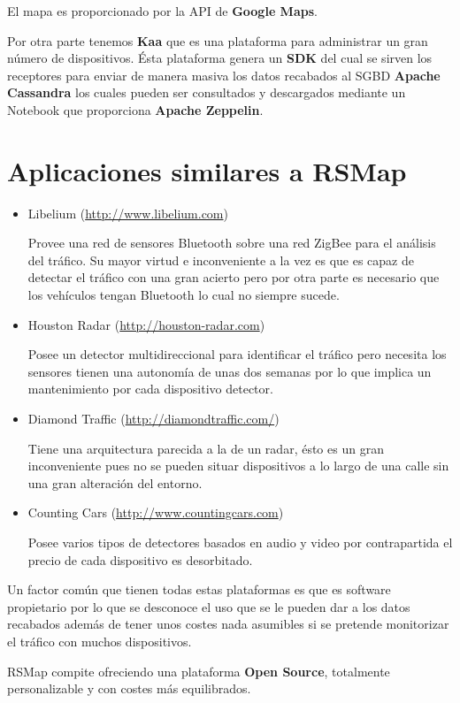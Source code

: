 El mapa es proporcionado por la API de \textbf{Google Maps}.

Por otra parte tenemos \textbf{Kaa} que es una plataforma para administrar un gran número de dispositivos. Ésta plataforma genera un \textbf{SDK} del cual se sirven los receptores para enviar de manera masiva los datos recabados al SGBD \textbf{Apache Cassandra} los cuales pueden ser consultados y descargados mediante un Notebook que proporciona \textbf{Apache Zeppelin}.

\section{Aplicaciones similares a RSMap}
\begin{itemize}
  \item Libelium (\url{http://www.libelium.com})

    Provee una red de sensores Bluetooth sobre una red ZigBee para el análisis del tráfico. Su mayor virtud e inconveniente a la vez es que es capaz de detectar el tráfico con una gran acierto pero por otra parte es necesario que los vehículos tengan Bluetooth lo cual no siempre sucede.
  \item Houston Radar (\url{http://houston-radar.com})

    Posee un detector multidireccional para identificar el tráfico pero necesita los sensores tienen una autonomía de unas dos semanas por lo que implica un mantenimiento por cada dispositivo detector.
  \item Diamond Traffic (\url{http://diamondtraffic.com/})

    Tiene una arquitectura parecida a la de un radar, ésto es un gran inconveniente pues no se pueden situar dispositivos a lo largo de una calle sin una gran alteración del entorno.
  \item Counting Cars (\url{http://www.countingcars.com})

    Posee varios tipos de detectores basados en audio y video por contrapartida el precio de cada dispositivo es desorbitado.
\end{itemize}

Un factor común que tienen todas estas plataformas es que es software propietario por lo que se desconoce el uso que se le pueden dar a los datos recabados además de tener unos costes nada asumibles si se pretende monitorizar el tráfico con muchos dispositivos.

RSMap compite ofreciendo una plataforma \textbf{Open Source}, totalmente personalizable y con costes más equilibrados.

